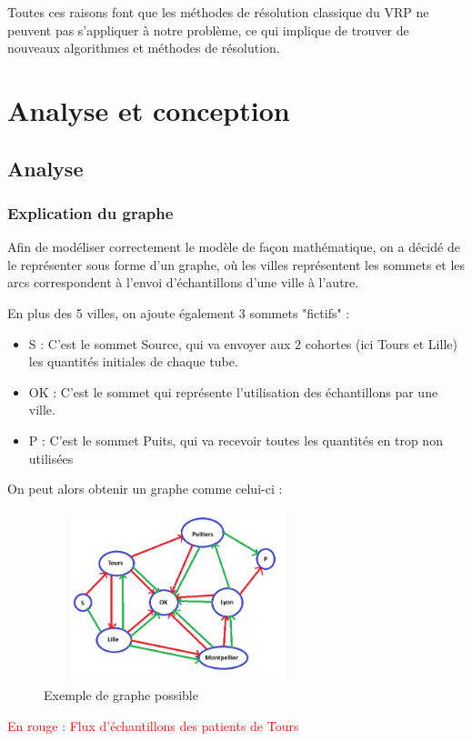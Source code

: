 \documentclass{polytech/polytech}
\numberwithin{figure}{chapter}
\begin{document}
Toutes ces raisons font que les méthodes de résolution classique du VRP ne peuvent pas s'appliquer à notre problème, ce qui implique de trouver de nouveaux algorithmes et méthodes de résolution.         
\chapter{Analyse et conception}
\section{Analyse}
\subsection{Explication du graphe}
Afin de modéliser correctement le modèle de façon mathématique, on a décidé de le représenter sous forme d'un graphe, où les villes représentent les sommets et les arcs correspondent à l'envoi d'échantillons d'une ville à l'autre.

En plus des 5 villes, on ajoute également 3 sommets "fictifs" : 
\begin{itemize}
	\item S : C'est le sommet Source, qui va envoyer aux 2 cohortes (ici Tours et Lille) les quantités initiales de chaque tube.
	\item OK : C'est le sommet qui représente l'utilisation des échantillons par une ville.
	\item P : C'est le sommet Puits, qui va recevoir toutes les quantités en trop non utilisées\\
\end{itemize}

On peut alors obtenir un graphe comme celui-ci :

\begin{figure}[ht]
    \centering
    \includegraphics[width=0.7\textwidth, height=5cm]{pic/graph.png}
    \caption{Exemple de graphe possible}
    \label{Exemple de graphe possible}
\end{figure}
\textcolor{red}{En rouge : Flux d'échantillons des patients de Tours}
\end{document}
